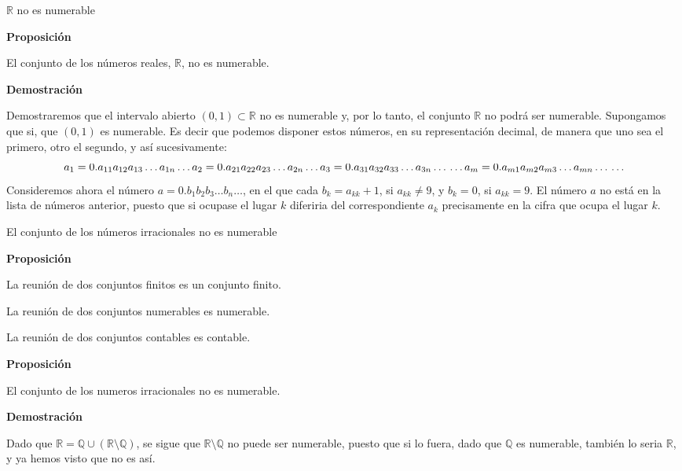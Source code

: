 \documentclass[ignorenonframetext,]{beamer}
\begin{document}
\begin{frame}{\(\mathbb{R}\) no es numerable}
\protect\hypertarget{mathbbr-no-es-numerable}{}

 \textbf{Proposición}

El conjunto de los números reales, \(\mathbb{R}\), no es numerable.

\textbf{Demostración}

Demostraremos que el intervalo abierto \((0,1) \subset \mathbb{R}\) no
es numerable y, por lo tanto, el conjunto \(\mathbb{R}\) no podrá ser
numerable. Supongamos que si, que \((0,1)\) es numerable. Es decir que
podemos disponer estos números, en su representación decimal, de manera
que uno sea el primero, otro el segundo, y así sucesivamente: \[
a_1 = 0.a_{11}a_{12}a_{13} \ldots a_{1n} \ldots \\
a_2 = 0.a_{21}a_{22}a_{23} \ldots a_{2n} \ldots \\
a_3 = 0.a_{31}a_{32}a_{33} \ldots a_{3n} \ldots \\
\ldots\\
a_m = 0.a_{m1}a_{m2}a_{m3} \ldots a_{mn} \ldots\\
\ldots
\] Consideremos ahora el número \(a=0.b_1b_2b_3 \ldots b_n \ldots\), en
el que cada \(b_k=a_{kk}+1\), si \(a_{kk} \neq 9\), y \(b_k = 0\), si
\(a_{kk} = 9\). El número \(a\) no está en la lista de números anterior,
puesto que si ocupase el lugar \(k\) diferiria del correspondiente
\(a_k\) precisamente en la cifra que ocupa el lugar \(k\).

\end{frame}

\begin{frame}{El conjunto de los números irracionales no es numerable}
\protect\hypertarget{el-conjunto-de-los-nuxfameros-irracionales-no-es-numerable}{}

 \textbf{Proposición}

La reunión de dos conjuntos finitos es un conjunto finito.

La reunión de dos conjuntos numerables es numerable.

La reunión de dos conjuntos contables es contable.

 \textbf{Proposición}

El conjunto de los numeros irracionales no es numerable.

\textbf{Demostración}

Dado que
\(\mathbb{R} = \mathbb{Q} \cup (\mathbb{R} \setminus \mathbb{Q})\), se
sigue que \(\mathbb{R} \setminus \mathbb{Q}\) no puede ser numerable,
puesto que si lo fuera, dado que \(\mathbb{Q}\) es numerable, también lo
seria \(\mathbb{R}\), y ya hemos visto que no es así.

\end{frame}
\end{document}
